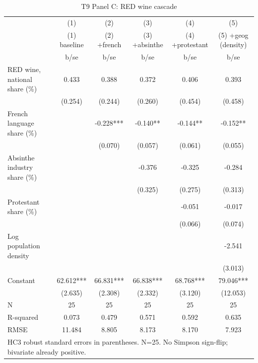 \begin{table}[htbp]\centering
\def\sym#1{\ifmmode^{#1}\else\(^{#1}\)\fi}
\caption{T9 Panel C: RED wine cascade \label{tab:T9\_C}}
\begin{tabular}{l*{5}{c}}
\toprule
            &\multicolumn{1}{c}{(1)}&\multicolumn{1}{c}{(2)}&\multicolumn{1}{c}{(3)}&\multicolumn{1}{c}{(4)}&\multicolumn{1}{c}{(5)}\\
            &\multicolumn{1}{c}{(1) baseline}&\multicolumn{1}{c}{(2) +french}&\multicolumn{1}{c}{(3) +absinthe}&\multicolumn{1}{c}{(4) +protestant}&\multicolumn{1}{c}{(5) +geog (density)}\\
            &        b/se   &        b/se   &        b/se   &        b/se   &        b/se   \\
\midrule
RED wine, national share (\%)&       0.433   &       0.388   &       0.372   &       0.406   &       0.393   \\
            &     (0.254)   &     (0.244)   &     (0.260)   &     (0.454)   &     (0.458)   \\
French language share (\%)&               &      -0.228***&      -0.140** &      -0.144** &      -0.152** \\
            &               &     (0.070)   &     (0.057)   &     (0.061)   &     (0.055)   \\
Absinthe industry share (\%)&               &               &      -0.376   &      -0.325   &      -0.284   \\
            &               &               &     (0.325)   &     (0.275)   &     (0.313)   \\
Protestant share (\%)&               &               &               &      -0.051   &      -0.017   \\
            &               &               &               &     (0.066)   &     (0.074)   \\
Log population density&               &               &               &               &      -2.541   \\
            &               &               &               &               &     (3.013)   \\
Constant    &      62.612***&      66.831***&      66.838***&      68.768***&      79.046***\\
            &     (2.635)   &     (2.308)   &     (2.332)   &     (3.120)   &    (12.053)   \\
\midrule
N           &          25   &          25   &          25   &          25   &          25   \\
R-squared   &       0.073   &       0.479   &       0.571   &       0.592   &       0.635   \\
RMSE        &      11.484   &       8.805   &       8.173   &       8.170   &       7.923   \\
\bottomrule
\multicolumn{6}{l}{\footnotesize HC3 robust standard errors in parentheses.  N=25.  No Simpson sign-flip; bivariate already positive.}\\
\end{tabular}
\end{table}

